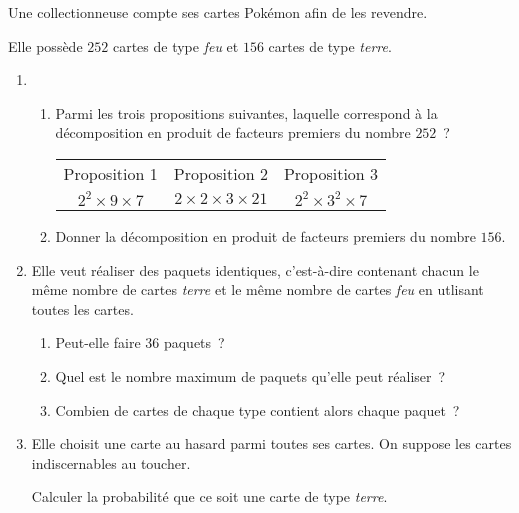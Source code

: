 
\medskip

Une collectionneuse compte ses cartes Pokémon afin de les revendre.

Elle possède $252$ cartes de type \og{}\textit{feu}\fg{} et $156$ cartes de type \og{}\textit{terre}\fg{}.

\begin{enumerate}[itemsep=1em]
\item \begin{enumerate}
  \item Parmi les trois propositions suivantes, laquelle correspond à la décomposition en produit de facteurs premiers du nombre $252$~?

    \begin{center}
      \renewcommand{\arraystretch}{1.5}
      \begin{tabular}{|*{3}{c|}}
      \hline
      Proposition 1 & Proposition 2 & Proposition 3 \\
      $2^2\times9\times7$ & $2\times2\times3\times21$ & $2^2\times3^2\times7$\\
      \hline
    \end{tabular}
  \end{center}
  \item Donner la décomposition en produit de facteurs premiers du nombre $156$.
  \end{enumerate}
\item Elle veut réaliser des paquets identiques, c'est-à-dire contenant chacun le même nombre de cartes \og{}\textit{terre}\fg{}  et le même nombre de cartes \og{}\textit{feu}\fg{}  en utlisant toutes les cartes.
  \begin{enumerate}
  \item Peut-elle faire $36$ paquets~?
  \item Quel est le nombre maximum de paquets qu'elle peut réaliser~?
  \item Combien de cartes de chaque type contient alors chaque paquet~?
  \end{enumerate}
\item Elle choisit une carte au hasard parmi toutes ses cartes. On suppose les cartes indiscernables au toucher.\medskip

  Calculer la probabilité que ce soit une carte de type \og{}\textit{terre}\fg{}.
\end{enumerate}
\medskip

